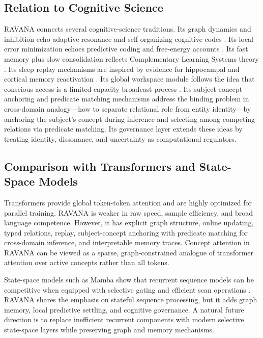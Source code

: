\documentclass[11pt]{article}
\begin{document}
\subsection{Relation to Cognitive Science}
RAVANA connects several cognitive-science traditions. Its graph dynamics and inhibition echo adaptive resonance and self-organizing cognitive codes \cite{grossberg1980}. Its local error minimization echoes predictive coding and free-energy accounts \cite{friston2010}. Its fast memory plus slow consolidation reflects Complementary Learning Systems theory \cite{mcclelland1995,kumaran2016}. Its sleep replay mechanisms are inspired by evidence for hippocampal and cortical memory reactivation \cite{wilson1994,ji2007,diekelmann2010}. Its global workspace module follows the idea that conscious access is a limited-capacity broadcast process \cite{baars1997}. Its subject-concept anchoring and predicate matching mechanisms address the binding problem in cross-domain analogy---how to separate relational role from entity identity---by anchoring the subject's concept during inference and selecting among competing relations via predicate matching. Its governance layer extends these ideas by treating identity, dissonance, and uncertainty as computational regulators.

\subsection{Comparison with Transformers and State-Space Models}
Transformers provide global token-token attention and are highly optimized for parallel training. RAVANA is weaker in raw speed, sample efficiency, and broad language competence. However, it has explicit graph structure, online updating, typed relations, replay, subject-concept anchoring with predicate matching for cross-domain inference, and interpretable memory traces. Concept attention in RAVANA can be viewed as a sparse, graph-constrained analogue of transformer attention over active concepts rather than all tokens.

State-space models such as Mamba show that recurrent sequence models can be competitive when equipped with selective gating and efficient scan operations \cite{gu2023}. RAVANA shares the emphasis on stateful sequence processing, but it adds graph memory, local predictive settling, and cognitive governance. A natural future direction is to replace inefficient recurrent components with modern selective state-space layers while preserving graph and memory mechanisms.
\end{document}
